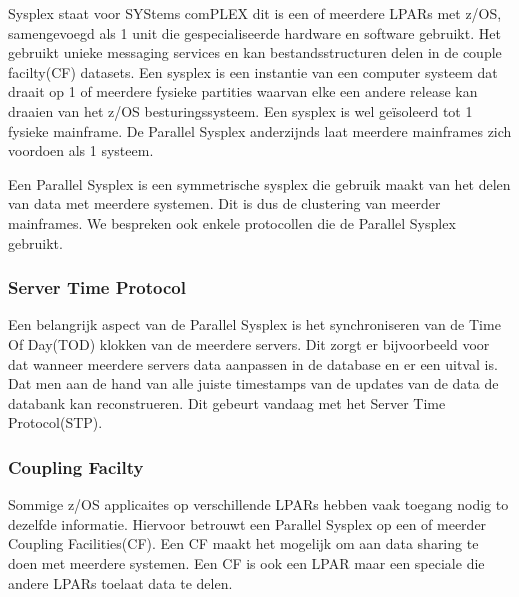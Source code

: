 Sysplex staat voor SYStems comPLEX dit is een of meerdere LPARs met z/OS, samengevoegd als 1 unit die gespecialiseerde hardware en software gebruikt. Het gebruikt unieke messaging services en kan bestandsstructuren delen in de couple facilty(CF) datasets. Een sysplex is een instantie van een computer systeem dat draait op 1 of meerdere fysieke partities waarvan elke een andere release kan draaien van het z/OS besturingssysteem. Een sysplex is wel geïsoleerd tot 1 fysieke mainframe. De Parallel Sysplex anderzijnds laat meerdere mainframes zich voordoen als 1 systeem. \cite{Ebbers2011} 

Een Parallel Sysplex is een symmetrische sysplex die gebruik maakt van het delen van data met meerdere systemen. Dit is dus de clustering van meerder mainframes. We bespreken ook enkele protocollen die de Parallel Sysplex gebruikt. 

\subsubsection{Server Time Protocol}
\label{subsubsec:Server Time Protocol}

Een belangrijk aspect van de Parallel Sysplex is het synchroniseren van de Time Of Day(TOD) klokken van de meerdere servers. Dit zorgt er bijvoorbeeld voor dat wanneer meerdere servers data aanpassen in de database en er een uitval is. Dat men aan de hand van alle juiste timestamps van de updates van de data de databank kan reconstrueren. Dit gebeurt vandaag met het Server Time Protocol(STP). \cite{Ebbers2011}

\subsubsection{Coupling Facilty}
\label{subsubsec:Coupling Facility}

Sommige z/OS applicaites op verschillende LPARs hebben vaak toegang nodig to dezelfde informatie. Hiervoor betrouwt een Parallel Sysplex op een of meerder Coupling Facilities(CF). Een CF maakt het mogelijk om aan data sharing te doen met meerdere systemen. Een CF is ook een LPAR maar een speciale die andere LPARs toelaat data te delen.

